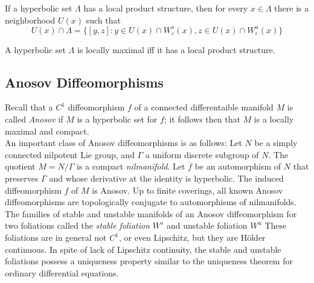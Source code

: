 \indent If a hyperbolic set $\Lambda$ has a local product structure, then for every $x \in \Lambda$ there is a neighborhood $U(x)$ such that 
\[
U(x) \cap \Lambda = \{ [y,z] : y  \in U(x) \cap W^s_{\varepsilon}(x), z \in U(x) \cap W^u_{\varepsilon}(x) \}
\]

\begin{prop}

A hyperbolic set $\Lambda$ is locally maximal iff it has a local product structure.

\end{prop}

\subsection{Anosov Diffeomorphisms}

Recall that a $C^1$ diffeomorphism $f$ of a connected differentaible manifold $M$ is called \textit{Anosov} if $M$ is a hyperbolic set for $f$; it follows then that $M$ is a locally maximal and compact. \\
\indent An important class of Anosov diffeomorphisms is as follows: Let $N$ be a simply connected nilpotent Lie group, and $\Gamma$ a uniform discrete subgroup of $N$. The quotient $M = N/\Gamma$ is a compact \textit{nilmanifold}. Let $\overline{f}$ be an automorphism of $N$ that preserves $\Gamma$ and whose derivative at the identity is hyperbolic. The induced diffeomorphism $f$ of $M$ is Anosov. Up to finite coverings, all known Anosov diffeomorphisms are topologically conjugate to automorphisms of nilmanifolds.\\
\indent The families of stable and unstable manifolds of an Anosov diffeomorphism for two foliations called the \textit{stable foliation} $W^s$ and unstable foliation $W^u$ These foliations are in general not $C^1$, or even Lipschitz, but they are H\"older continuous. In spite of lack of Lipschitz continuity, the stable and unstable foliations possess a uniqueness property similar to the uniqueness theorem for ordinary differential equations. \\
